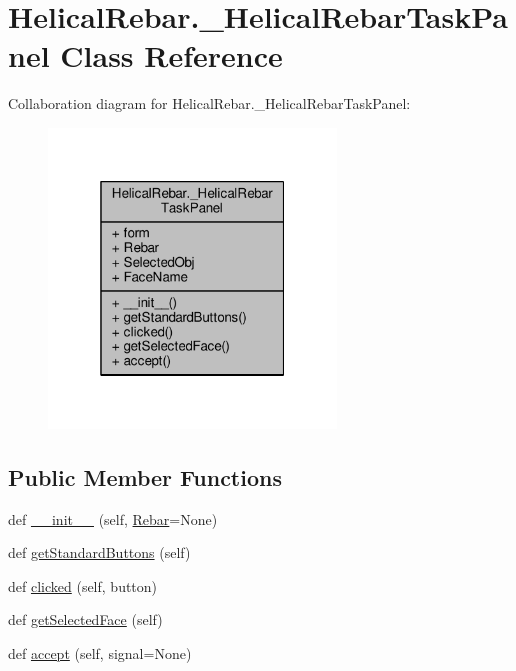 \hypertarget{classHelicalRebar_1_1__HelicalRebarTaskPanel}{}\section{Helical\+Rebar.\+\_\+\+Helical\+Rebar\+Task\+Panel Class Reference}
\label{classHelicalRebar_1_1__HelicalRebarTaskPanel}


Collaboration diagram for Helical\+Rebar.\+\_\+\+Helical\+Rebar\+Task\+Panel\+:\nopagebreak
\begin{figure}[H]
\begin{center}
\leavevmode
\includegraphics[width=217pt]{classHelicalRebar_1_1__HelicalRebarTaskPanel__coll__graph}
\end{center}
\end{figure}
\subsection*{Public Member Functions}
\begin{DoxyCompactItemize}
\item 
def \hyperlink{classHelicalRebar_1_1__HelicalRebarTaskPanel_a1bc9ff9f8e2cdbf9f12d974dd77c8e24}{\+\_\+\+\_\+init\+\_\+\+\_\+} (self, \hyperlink{classHelicalRebar_1_1__HelicalRebarTaskPanel_a18e1b46858c6d4ca5f6925d69ea15807}{Rebar}=None)
\item 
def \hyperlink{classHelicalRebar_1_1__HelicalRebarTaskPanel_aef7b43bb1c81a0d21bd80cfbe56229bf}{get\+Standard\+Buttons} (self)
\item 
def \hyperlink{classHelicalRebar_1_1__HelicalRebarTaskPanel_ab0b70379d225d10e3585478005fc53ce}{clicked} (self, button)
\item 
def \hyperlink{classHelicalRebar_1_1__HelicalRebarTaskPanel_aea514ce88bde89c57ab88576e7a27230}{get\+Selected\+Face} (self)
\item 
def \hyperlink{classHelicalRebar_1_1__HelicalRebarTaskPanel_acdfb101876d4841ba277e2e884ebaf9d}{accept} (self, signal=None)
\end{DoxyCompactItemize}
